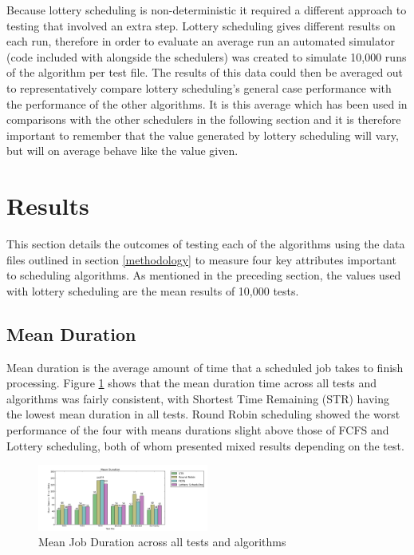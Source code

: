 \documentclass{acm_proc_article-sp}
\begin{document}
Because lottery scheduling is non-deterministic it required a different approach to testing that involved an extra step. Lottery scheduling gives different results on each run, therefore in order to evaluate an average run an automated simulator (code included with alongside the schedulers) was created to simulate 10,000 runs of the algorithm per test file. The results of this data could then be averaged out to representatively compare lottery scheduling's general case performance with the performance of the other algorithms. It is this average which has been used in comparisons with the other schedulers in the following section and it is therefore important to remember that the value generated by lottery scheduling will vary, but will on average behave like the value given.

\section{Results}
\label{results}
This section details the outcomes of testing each of the algorithms using the data files outlined in section \ref{methodology} to measure four key attributes important to scheduling algorithms. As mentioned in the preceding section, the values used with lottery scheduling are the mean results of 10,000 tests.

\subsection{Mean Duration}
\label{results-duration}
Mean duration is the average amount of time that a scheduled job takes to finish processing. Figure \ref{fig:duration} shows that the mean duration time across all tests and algorithms was fairly consistent, with Shortest Time Remaining (STR) having the lowest mean duration in all tests. Round Robin scheduling showed the worst performance of the four with means durations slight above those of FCFS and Lottery scheduling, both of whom presented mixed results depending on the test.

\begin{figure}[H]
\centering
\includegraphics[width=0.5\textwidth]{duration.png}
\caption{Mean Job Duration across all tests and algorithms}
\label{fig:duration}
\end{figure}
\end{document}
